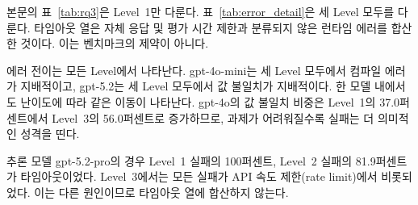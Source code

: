 본문의 표~\ref{tab:rq3}은 Level~1만 다룬다. 표~\ref{tab:error_detail}은 세 Level 모두를 다룬다.
타임아웃 열은 자체 응답 및 평가 시간 제한과 분류되지 않은 런타임 에러를 합산한 것이다.
이는 벤치마크의 제약이 아니다.

\begin{table}[h]
\centering
\small
\setlength{\tabcolsep}{4pt}
\caption{모델별, Level별 실패 과제 중 각 에러 유형의 비중.}
\label{tab:error_detail}
\end{table}

에러 전이는 모든 Level에서 나타난다. gpt-4o-mini는 세 Level 모두에서 컴파일 에러가 지배적이고,
gpt-5.2는 세 Level 모두에서 값 불일치가 지배적이다. 한 모델 내에서도 난이도에 따라 같은 이동이
나타난다. gpt-4o의 값 불일치 비중은 Level~1의 37.0퍼센트에서 Level~3의 56.0퍼센트로 증가하므로,
과제가 어려워질수록 실패는 더 의미적인 성격을 띤다.

추론 모델 gpt-5.2-pro의 경우 Level~1 실패의 100퍼센트, Level~2 실패의 81.9퍼센트가 타임아웃이었다.
Level~3에서는 모든 실패가 API 속도 제한(rate limit)에서 비롯되었다. 이는 다른 원인이므로
타임아웃 열에 합산하지 않는다.

